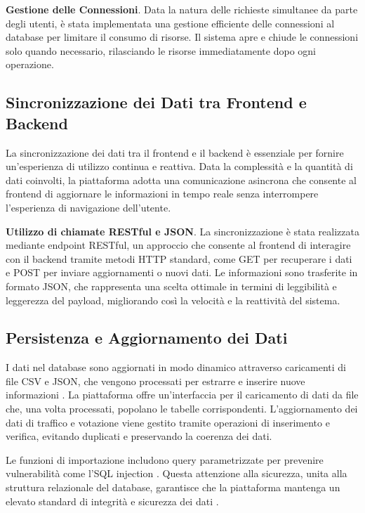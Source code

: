 \textbf{Gestione delle Connessioni}. Data la natura delle richieste simultanee da parte degli utenti, è stata implementata una gestione efficiente delle connessioni al database per limitare il consumo di risorse. Il sistema apre e chiude le connessioni solo quando necessario, rilasciando le risorse immediatamente dopo ogni operazione.

\subsection{Sincronizzazione dei Dati tra Frontend e Backend}

La sincronizzazione dei dati tra il frontend e il backend è essenziale per fornire un’esperienza di utilizzo continua e reattiva. Data la complessità e la quantità di dati coinvolti, la piattaforma adotta una comunicazione asincrona che consente al frontend di aggiornare le informazioni in tempo reale senza interrompere l’esperienza di navigazione dell’utente.

\textbf{Utilizzo di chiamate RESTful e JSON}. La sincronizzazione è stata realizzata mediante endpoint RESTful, un approccio che consente al frontend di interagire con il backend tramite metodi HTTP standard, come GET per recuperare i dati e POST per inviare aggiornamenti o nuovi dati. Le informazioni sono trasferite in formato JSON, che rappresenta una scelta ottimale in termini di leggibilità e leggerezza del payload, migliorando così la velocità e la reattività del sistema.


\subsection{Persistenza e Aggiornamento dei Dati}
I dati nel database sono aggiornati in modo dinamico attraverso caricamenti di file CSV e JSON, che vengono processati per estrarre e inserire nuove informazioni \cite{loshin2012bigdata}. La piattaforma offre un’interfaccia per il caricamento di dati da file che, una volta processati, popolano le tabelle corrispondenti. L’aggiornamento dei dati di traffico e votazione viene gestito tramite operazioni di inserimento e verifica, evitando duplicati e preservando la coerenza dei dati.

Le funzioni di importazione includono query parametrizzate per prevenire vulnerabilità come l’SQL injection \cite{liskov2012query}. Questa attenzione alla sicurezza, unita alla struttura relazionale del database, garantisce che la piattaforma mantenga un elevato standard di integrità e sicurezza dei dati \cite{korth2010database}.


